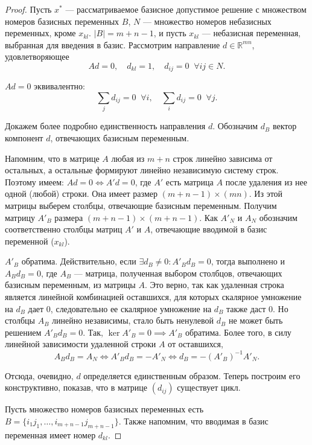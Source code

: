 \documentclass[12pt]{article}
\theoremstyle{definition}
\theoremstyle{plain}
\theoremstyle{definition}
\begin{document}
\begin{proof}

Пусть $x^*$ --- рассматриваемое базисное допустимое решение с множеством
номеров базисных переменных $B$, $N$ --- множество номеров небазисных
переменных, кроме $x_{kl}$. 
$|B| = m+n-1$, и пусть $x_{kl}$ --- небазисная переменная, выбранная для введения 
в базис. Рассмотрим направление $d \in \mathbb{R}^{mn}$, удовлетворяющее
\[
A d = 0, \quad d_{kl} = 1, \quad d_{ij} = 0 \; \; \forall {ij}\in N.
\]

$A d = 0$ эквивалентно:
\[
\sum_{j}d_{ij} = 0 \; \; \forall i, \quad \sum_{i}d_{ij} = 0 \; \; \forall j.
\]

Докажем более подробно единственность направления $d$. Обозначим $d_B$ вектор компонент $d$, отвечающих базисным переменным.

Напомним, что в матрице $A$ любая из $m + n$ строк линейно зависима от
остальных, а остальные формируют линейно независимую систему строк.
Поэтому имеем: $Ad=0 \iff A'd=0$, где $A'$ есть матрица $A$ после удаления
из нее одной (любой) строки.
Она имеет размер $(m + n - 1) \times (mn)$. Из этой матрицы выберем столбцы,
отвечающие базисным переменным. Получим матрицу $A'_B$ размера
$(m + n - 1) \times (m + n - 1)$. Как $A'_N$ и $A_N$ обозначим соответственно
столбцы матриц
$A'$ и $A$, отвечающие вводимой в базис переменной ($x_{kl}$).

$A'_B$ обратима. Действительно, если $\exists d_B \neq 0: A'_B d_B = 0$,
тогда выполнено и $A_B d_B = 0$, где $A_B$ --- матрица, полученная выбором
столбцов, отвечающих базисным переменным, из матрицы $A$. Это верно, так как
удаленная строка является линейной комбинацией оставшихся,
для которых скалярное умножение
на $d_B$ дает 0, следовательно ее скалярное умножение на $d_B$ также даст 0.
Но столбцы $A_B$ линейно независимы, стало быть ненулевой $d_B$ не может
быть решением $A'_B d_B = 0$. Так, $\ker A'_B = {0} \implies A'_B$ обратима.
Более того, в силу линейной зависимости удаленной строки $A$ от оставшихся,
\begin{equation}
  A_B d_B = A_N \iff A'_B d_B = -A'_N \iff d_B = -(A'_B)^{-1}A'_N.
\end{equation}

Отсюда, очевидно, $d$ определяется единственным образом. Теперь
построим его конструктивно, показав, что в матрице $(d_{ij})$ существует цикл.

Пусть множество номеров базисных переменных есть
$B = \{i_1j_1,\dots,i_{m+n-1}j_{m+n-1}\}$. Также напомним, что
вводимая в базис переменная имеет номер $d_{kl}$.


\end{proof}
\end{document}
